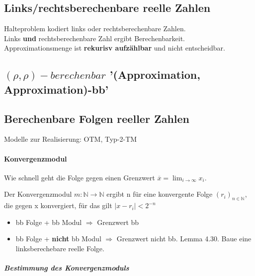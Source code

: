 \documentclass[ngerman]{scrartcl}
\begin{document}
\subsection{Links/rechtsberechenbare reelle Zahlen}
Halteproblem kodiert links oder rechtsberechenbare Zahlen. \\
Links \textbf{und} rechtsberechenbare Zahl ergibt Berechenbarkeit. Approximationsmenge ist \textbf{rekurisv aufzählbar} und nicht entscheidbar.


\subsection{$ (\rho, \rho)-berechenbar $ '(Approximation, Approximation)-bb'}


\subsection{Berechenbare Folgen reeller Zahlen}
Modelle zur Realisierung: OTM, Typ-2-TM


\paragraph{Konvergenzmodul}
Wie schnell geht die Folge gegen einen Grenzwert $ \overline{x} = \lim_{i \rightarrow \infty} x_ i $.

Der Konvergenzmodul $ m : \mathbb{N} \rightarrow \mathbb{N} $ ergibt n für eine konvergente Folge $ (r_i)_{n \in \mathbb {N}}$, die gegen x konvergiert, für das gilt $ |x - r_i| < 2^{-n} $
\begin{itemize}
  \item bb Folge + bb Modul $ \Rightarrow $ Grenzwert bb
  \item bb Folge + \textbf{nicht} bb Modul $ \Rightarrow $ Grenzwert nicht bb. Lemma 4.30. Baue eine linksberechebare reelle Folge.
\end{itemize}

\subparagraph{Bestimmung des Konvergenzmoduls}
\end{document}
